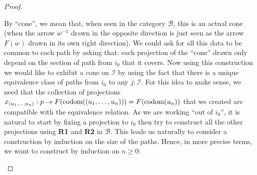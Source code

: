 \documentclass{article}
\numberwithin{equation}{section}
\theoremstyle{definition}
\theoremstyle{plain}
\begin{document}
\begin{proof}
\begin{enumerate}
		By ``cone'', we mean that, when seen in the category $\mathcal{B}$, this is an actual cone (when the arrow $w^{-1}$ drawn in the opposite direction is just seen as the arrow $F(w)$ drawn in its own right direction). We could ask for all this data to be common to each path by asking that: each projection of the ``cone'' drawn only depend on the section of path from $i_0$ that it covers. Now using this construction we would like to exhibit a cone on $\mathcal{I}$ by using the fact that there is a unique equivalence class of paths from $i_0$ to any $j:\mathcal{I}$. For this idea to make sense, we need that the collection of projections $x_{(u_1, \dots, u_n)}: p \to F(\textnormal{codom}((u_1, \dots, u_n))) = F(\textnormal{codom}(u_n))$ that we created are compatible with the equivalence relation. As we are working ``out of $i_0$'', it is natural to start by fixing a projection to $i_0$ then try to construct all the other projections using \textbf{R1} and \textbf{R2} in $\mathcal{B}$. This leads us naturally to consider a construction by induction on the size of the paths. Hence, in more precise terms, we want to construct by induction on $n \ge 0$:
		

\end{enumerate}
\end{proof}
\end{document}
